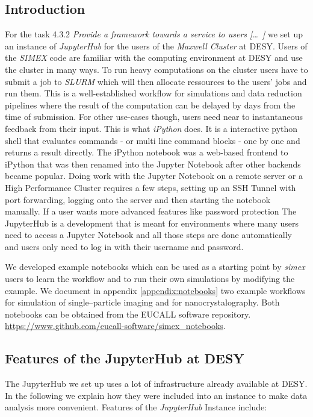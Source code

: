 \documentclass[10pt]{scrartcl}
\begin{document}
\subsection{Introduction}
For the task 4.3.2 \textit{Provide a framework towards a service to users [\dots\ ] } we set up an instance of \textit{JupyterHub} for the users of the \textit{Maxwell Cluster} at \textsc{DESY}.
Users of the \textit{SIMEX} code are familiar with the computing environment at \textsc{DESY} and use the cluster in many ways.
To run heavy computations on the cluster users have to submit a job to \textit{SLURM} which will then allocate ressources to the users' jobs and run them.
This is a well-established workflow for simulations and data reduction pipelines where the result of the
computation can be delayed by days from the time of submission.
For other use-cases though, users need near to instantaneous feedback from their input.
This is what \textit{iPython} does. It is a interactive python shell that evaluates commands - or multi line command blocks - one by one and returns a result directly.
The iPython notebook was a web-based frontend to iPython that was then renamed into the Jupyter Notebook after other backends became popular.
Doing work with the Jupyter Notebook on a remote server or a High Performance Cluster requires a few steps, setting up an SSH Tunnel with port forwarding, logging onto the server and then starting the notebook manually.
If a user wants more advanced features like password protection
The JupyterHub is a development that is meant for environments where many users need to access a Jupyter Notebook and all those steps are done automatically and users only need to log in with their username and password.

We developed example notebooks which can be used as a starting point by
\textit{simex} users to learn the workflow and to run their own simulations by
modifying the example. We document in appendix \ref{appendix:notebooks}
two example workflows for simulation of
single--particle imaging and for nanocrystalography. Both notebooks can be
obtained from the EUCALL software repository.
\url{https://www.github.com/eucall-software/simex_notebooks}.

\subsection{Features of the JupyterHub at DESY}
The JupyterHub we set up uses a lot of infrastructure already available at DESY. In the following we explain how they were included into an instance to make data analysis more convenient.
Features of the \textit{JupyterHub} Instance include:
\end{document}

